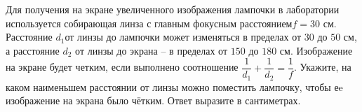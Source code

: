 \begin{ex}
	\begin{condition}
		Для получения на экране увеличенного изображения лампочки в лаборатории используется собирающая линза с главным фокусным расстоянием\(  f = 30 \) см. Расстояние \( d_1  \)от линзы до лампочки может изменяться в пределах от \( 30 \) до \( 50 \) см, а расстояние \( d_2 \) от линзы до экрана – в пределах от \( 150 \) до \( 180 \) см. Изображение на экране будет четким, если выполнено соотношение \( \dfrac{1}{d_1}+\dfrac{1}{d_2}=\dfrac{1}{f} \). Укажите, на каком наименьшем расстоянии от линзы можно поместить лампочку, чтобы еe изображение на экрана было чётким. Ответ выразите в сантиметрах.
	\end{condition}
\end{ex}